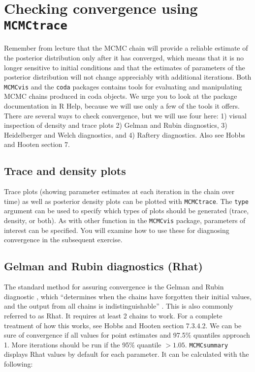\documentclass[12pt,english]{article}
\begin{document}
\section{Checking convergence using \texttt{MCMCtrace}}

Remember from lecture that the MCMC chain will provide a reliable estimate of the posterior distribution only after it has converged, which means that it is no longer sensitive to initial conditions and that the estimates of parameters of the posterior distribution will not change appreciably with additional iterations. Both \texttt{MCMCvis} and the \texttt{coda} packages contains tools for evaluating and manipulating MCMC chains produced in coda objects. We urge you to look at the package documentation in R Help, because we will use only a few of the tools it offers. There are several ways to check convergence, but we will use four here: 1) visual inspection of density and trace plots 2) Gelman and Rubin diagnostics, 3) Heidelberger and Welch diagnostics, and 4) Raftery diagnostics. Also see Hobbs and Hooten \citeyearpar{hobbs2015bayesian} section 7.


\subsection{Trace and density plots}

Trace plots (showing parameter estimates at each iteration in the chain over time) as well as posterior density plots can be plotted with \texttt{MCMCtrace}. The \texttt{type} argument can be used to specify which types of plots should be generated (trace, density, or both). As with other function in the \texttt{MCMCvis} package, parameters of interest can be specified. You will examine how to use these for diagnosing convergence in the subsequent exercise.


\subsection{Gelman and Rubin diagnostics (Rhat)}

The standard method for assuring convergence is the Gelman and Rubin diagnostic \citep{Gelman_Rubin}, which \enquote{determines when the chains have forgotten their initial values, and the output from all chains is indistinguishable} \citep{R-Core-Team:2015fk}. This is also commonly referred to as Rhat. It requires at least 2 chains to work. For a complete treatment of how this works, see Hobbs and Hooten \citeyearpar{hobbs2015bayesian} section 7.3.4.2. We can be sure of convergence if all values for point estimates and 97.5\% quantiles approach 1. More iterations should be run if the 95\% quantile $> 1.05$. \texttt{MCMCsummary} displays Rhat values by default for each parameter. It can be calculated with the following:
\end{document}
